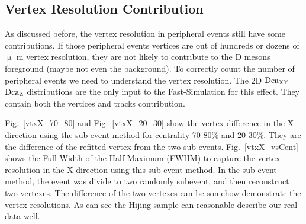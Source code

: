 \subsection{Vertex Resolution Contribution}
\label{concern2}

As discussed before, the vertex resolution in peripheral events still have some contributions. If those peripheral events vertices are out of hundreds or dozens of $\upmu$ m vertex resolution, they are not likely to contribute to the D mesons foreground (maybe not even the background). To correctly count the number of peripheral events we need to understand the vertex resolution. The 2D $\textup{Dca}_{\textup{XY}}$ $\textup{Dca}_\textup{Z}$ distributions are the only input to the Fast-Simulation for this effect. They contain both the vertices and tracks contribution. 

Fig.~\ref{vtxX_70_80} and Fig.~\ref{vtxX_20_30} show the vertex difference in the X direction using the sub-event method for centrality 70-80\% and 20-30\%. They are the difference of the refitted vertex from the two sub-events. Fig.~\ref{vtxX_vsCent} shows the Full Width of the Half Maximum (FWHM) to capture the vertex resolution in the X direction using this sub-event method. In the sub-event method, the event was divide to two randomly subevent, and then reconstruct two vertexes. The difference of the two vertexes can be somehow demonstrate the vertex resolutions. As can see the Hijing sample can reasonable describe our real data well.

